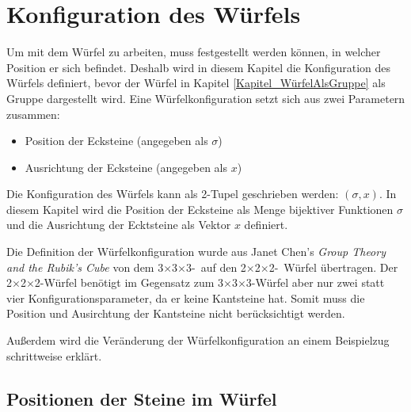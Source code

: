 \documentclass[12pt,a4paper, usenames, dvipsnames]{article}
\theoremstyle{mystyle}
\theoremstyle{definition}
\newtheorem{bsp}{Beispiel}[definition]
\newcommand{\Ttwo}{2$\times$2$\times$2-}
\newcommand{\Tthree}{3$\times$3$\times$3-}
\begin{document}
%
%
%
%
%
%
%
%
%
%
\newpage

\section{Konfiguration des Würfels}

\label{Kapitel_KonfigurationDesWürfels}

Um mit dem Würfel zu arbeiten, muss festgestellt werden können, in welcher Position er sich befindet.
Deshalb wird in diesem Kapitel die Konfiguration des Würfels definiert, bevor der Würfel in Kapitel \ref{Kapitel_WürfelAlsGruppe} als Gruppe dargestellt wird. Eine Würfelkonfiguration setzt sich aus zwei Parametern zusammen: 
\begin{itemize}
\item Position der Ecksteine (angegeben als $\sigma$)
\item Ausrichtung der Ecksteine (angegeben als $x$)
\end{itemize}
Die Konfiguration des Würfels kann als 2-Tupel geschrieben werden: $(\sigma, x)$.
In diesem Kapitel wird die Position der Ecksteine als Menge bijektiver Funktionen $\sigma$ und die Ausrichtung der Ecktsteine als Vektor $x$ definiert.

Die Definition der Würfelkonfiguration wurde aus Janet Chen's \textit{Group Theory and the Rubik's Cube} \cite{JC} von dem \Tthree \ auf den \Ttwo \ Würfel übertragen. Der \Ttwo Würfel benötigt im Gegensatz zum \Tthree Würfel aber nur zwei statt vier Konfigurationsparameter, da er keine Kantsteine hat. Somit muss die Position und Ausirchtung der Kantsteine nicht berücksichtigt werden.


Außerdem wird die Veränderung der Würfelkonfiguration an einem Beispielzug schrittweise erklärt.

%
%
%
%
%
%
%
%
%
%
%
%
%
%
%
%
%
%
%
%

\subsection{Positionen der Steine im Würfel} 
\end{document}
